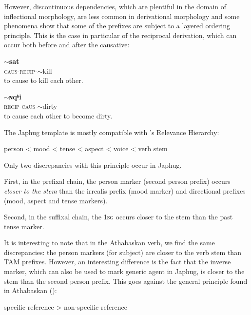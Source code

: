 \documentclass[oldfontcommands,twoside,a4paper,12pt]{article}
\newcommand{\ipa}[1]{{\phon\textbf{#1}}}
\newcommand{\caus}{\textsc{caus}}
\newcommand{\recip}{\textsc{recip}}
\begin{document}
 However, discontinuous dependencies, which are plentiful in the domain of inflectional morphology, are less common in derivational morphology and some phenomena show that some of the prefixes are subject to a layered ordering principle. This is the case in particular of the reciprocal derivation, which can occur both before and after the causative:
 
    \begin{exe}
\ex
\gll   \ipa{sɯ-ɤ-sɯ}$\sim$\ipa{sat} \\
		\caus{}-\recip{}-$\sim$kill \\
\glt to  cause to kill each other.
\end{exe} 
\begin{exe}
\ex
\gll   \ipa{a-sɯ-ɴqʰɯ}$\sim$\ipa{ɴqʰi} \\
		\recip{}-\caus{}-$\sim$dirty \\
 \glt to  cause each other to become dirty.
\end{exe} 


The Japhug template is mostly compatible with \citet{bybee85morpho}'s Relevance Hierarchy:
 
\begin{exe}
\ex  \label{bybee}
person < mood  < tense < aspect < voice < verb stem

\end{exe}
Only two discrepancies with this principle occur in Japhug.

First, in the prefixal chain, the person marker (second person prefix) occurs \textit{closer to the stem} than the irrealis prefix (mood marker) and directional prefixes (mood, aspect and tense markers). 

Second, in the suffixal chain, the 1\textsc{sg} occurs closer to the stem than the past tense marker.


It is interesting to note that in the Athabaskan verb, we find the same discrepancies: the person markers (for subject) are closer to the verb stem than TAM prefixes. However, an interesting difference is the fact that the inverse marker, which can also be used to mark generic agent in Japhug, is closer to the stem than the second person prefix. This goes against the general principle found in Athabaskan (\citealt[245]{rice2000scope}):

\begin{exe}
\ex 
\glt specific reference > non-specific reference 

\end{exe}
\end{document}

